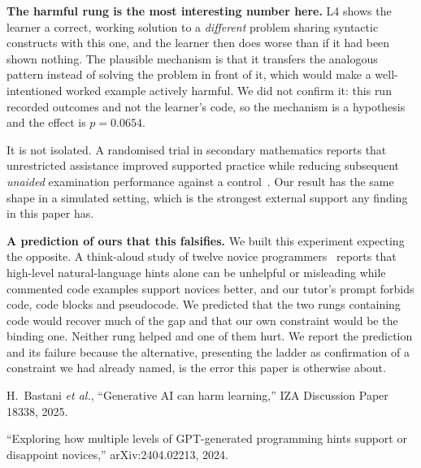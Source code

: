 \textbf{The harmful rung is the most interesting number here.} L4 shows the
learner a correct, working solution to a \emph{different} problem sharing
syntactic constructs with this one, and the learner then does worse than if it
had been shown nothing. The plausible mechanism is that it transfers the
analogous pattern instead of solving the problem in front of it, which would
make a well-intentioned worked example actively harmful. We did not confirm it:
this run recorded outcomes and not the learner's code, so the mechanism is a
hypothesis and the effect is $p{=}0.0654$.

It is not isolated. A randomised trial in secondary mathematics reports that
unrestricted assistance improved supported practice while reducing subsequent
\emph{unaided} examination performance against a control~\cite{bastani}. Our
result has the same shape in a simulated setting, which is the strongest
external support any finding in this paper has.

\textbf{A prediction of ours that this falsifies.} We built this experiment
expecting the opposite. A think-aloud study of twelve novice
programmers~\cite{hintlevels} reports that high-level natural-language hints
alone can be unhelpful or misleading while commented code examples support
novices better, and our tutor's prompt forbids code, code blocks and
pseudocode. We predicted that the two rungs containing code would recover much
of the gap and that our own constraint would be the binding one. Neither rung
helped and one of them hurt. We report the prediction and its failure because
the alternative, presenting the ladder as confirmation of a constraint we had
already named, is the error this paper is otherwise about.


H.~Bastani \emph{et al.}, ``Generative AI can harm learning,'' IZA Discussion
Paper 18338, 2025.

``Exploring how multiple levels of GPT-generated programming hints support or
disappoint novices,'' arXiv:2404.02213, 2024. %


